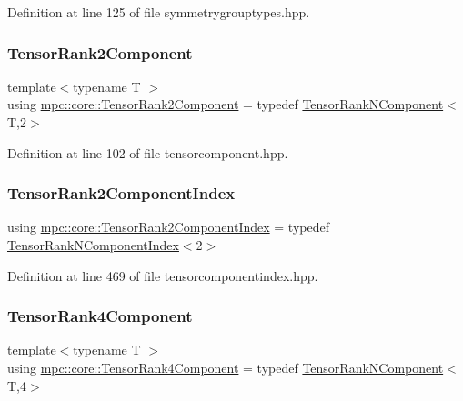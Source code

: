 Definition at line 125 of file symmetrygrouptypes.\+hpp.

\mbox{\label{namespacempc_1_1core_a467e1fa517a8c269b033fef3aa281360}} 
\subsubsection{\texorpdfstring{Tensor\+Rank2\+Component}{TensorRank2Component}}
{\footnotesize\ttfamily template$<$typename T $>$ \\
using \mbox{\hyperlink{namespacempc_1_1core_a467e1fa517a8c269b033fef3aa281360}{mpc\+::core\+::\+Tensor\+Rank2\+Component}} = typedef \mbox{\hyperlink{classmpc_1_1core_1_1_tensor_rank_n_component}{Tensor\+Rank\+N\+Component}}$<$T,2$>$}



Definition at line 102 of file tensorcomponent.\+hpp.

\mbox{\label{namespacempc_1_1core_a7ae080dac58868c1e167479dce34928a}} 
\subsubsection{\texorpdfstring{Tensor\+Rank2\+Component\+Index}{TensorRank2ComponentIndex}}
{\footnotesize\ttfamily using \mbox{\hyperlink{namespacempc_1_1core_a7ae080dac58868c1e167479dce34928a}{mpc\+::core\+::\+Tensor\+Rank2\+Component\+Index}} = typedef \mbox{\hyperlink{classmpc_1_1core_1_1_tensor_rank_n_component_index}{Tensor\+Rank\+N\+Component\+Index}}$<$2$>$}



Definition at line 469 of file tensorcomponentindex.\+hpp.

\mbox{\label{namespacempc_1_1core_ac3a232afc7c680d580628e834030482f}} 
\subsubsection{\texorpdfstring{Tensor\+Rank4\+Component}{TensorRank4Component}}
{\footnotesize\ttfamily template$<$typename T $>$ \\
using \mbox{\hyperlink{namespacempc_1_1core_ac3a232afc7c680d580628e834030482f}{mpc\+::core\+::\+Tensor\+Rank4\+Component}} = typedef \mbox{\hyperlink{classmpc_1_1core_1_1_tensor_rank_n_component}{Tensor\+Rank\+N\+Component}}$<$T,4$>$}



